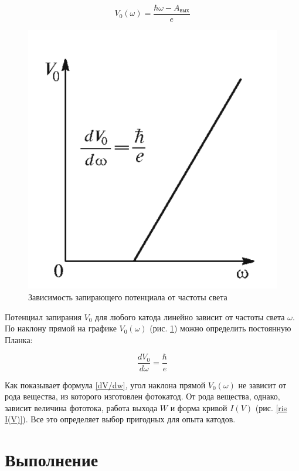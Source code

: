\documentclass[a4paper,12pt]{article}
\theoremstyle{definition}
\begin{document}
	\begin{equation}\label{V(w)}
	V_0 (\omega) = \dfrac{\hbar\omega - A_{\text{вых}}}{e}
	\end{equation}
	
		\begin{figure}
		\includegraphics[width=\linewidth]{V_w.png}
		\caption{Зависимость запирающего потенциала
			от частоты света}
		\label{ris V(w)}
	\end{figure}
	
	Потенциал запирания $ V_0 $ для любого катода линейно зависит от
	частоты света $ \omega $. По наклону прямой на графике $ V_0(\omega) $ (рис. \ref{ris V(w)}) можно определить постоянную Планка:
	
	\begin{equation}\label{dV/dw}
	\dfrac{dV_0}{d\omega} = \dfrac{\hbar}{e}
	\end{equation}
	
	Как показывает формула \eqref{dV/dw}, угол наклона прямой $ V_0(\omega) $ не зависит от рода вещества, из которого изготовлен фотокатод. От рода вещества, однако, зависит величина фототока, работа выхода $ W $ и форма кривой $ I(V) $ (рис. \ref{ris I(V)}). Все это определяет выбор пригодных для
	опыта катодов.

    \section{Выполнение}
	
\end{document}
